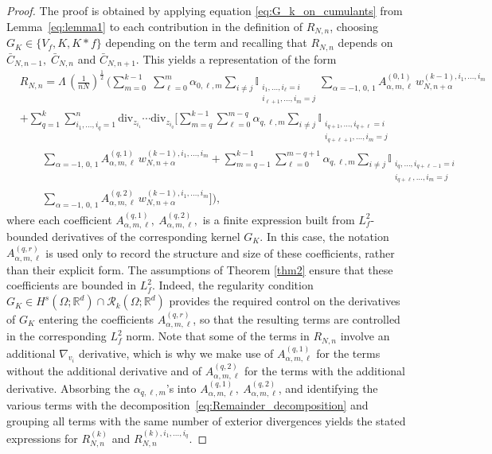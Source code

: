 \documentclass[pdflatex,sn-mathphys-num]{sn-jnl}
\theoremstyle{thmstyleone}%
\theoremstyle{thmstyletwo}%
\theoremstyle{thmstylethree}%
\begin{document}
\begin{proof}
The proof is obtained by applying equation \eqref{eq:G_k_on_cumulants} from Lemma~\ref{eq:lemma1} to each contribution in the
definition of \(R_{N,n}\), choosing \(G_K\in\{V_f,K,K\ast f\}\) depending on the term and recalling that $R_{N,n}$ depends on $\bar C_{N,n-1},\;\bar C_{N,n}$ and $\bar C_{N,n+1}$. This yields a representation of the form
\[
\begin{aligned}
&R_{N,n}
= \Lambda\,\left(\tfrac{1}{nN}\right)^{\frac12}\,\Bigg(
\sum_{m=0}^{k-1} \;\sum_{\ell=0}^{m} \alpha_{0,\ell,m}
\sum_{i\neq j}
\mathbb{I}_{\substack{i_{1},\ldots, i_{\ell}=i \\ i_{\ell+1},\ldots,i_m=j}}
\sum_{\alpha=-1,\,0,\,1}
A_{\alpha,m,\ell}^{(0,1)}\,
w_{N,n+\alpha}^{(k-1),i_1,\dots,i_{m}}
\\
& 
+\sum_{q=1}^k\sum_{i_1,\dots,i_q=1}^n
\mathrm{div}_{z_{i_1}}\cdots \mathrm{div}_{z_{i_q}}
\Bigg[
\sum_{m=q}^{k-1} \sum_{\ell=0}^{m-q}\alpha_{q,\ell,m}
\sum_{i\neq j}
\mathbb{I}_{\substack{i_{q+1},\ldots, i_{q+\ell}=i \\ i_{q+\ell+1},\ldots,i_m=j}}
\\
&\qquad
\sum_{\alpha=-1,\,0,\,1} 
A_{\alpha,m,\ell}^{(q,1)}\,
w_{N,n+\alpha}^{(k-1),i_1,\dots,i_{m}} +\sum_{m=q-1}^{k-1} \sum_{\ell=0}^{m-q+1}\alpha_{q,\ell,m}
\sum_{i\neq j}
\mathbb{I}_{\substack{
i_{q},\ldots, i_{q+\ell-1}=i \\
i_{q+\ell},\ldots,i_m=j
}}
\\
&\qquad
\sum_{\alpha=-1,\,0,\,1}
A_{\alpha,m,\ell}^{(q,2)}\,
w_{N,n+\alpha}^{(k-1),i_1,\dots,i_m}
\Bigg]
\Bigg),
\end{aligned}
\]
where each coefficient \(A_{\alpha,m,\ell}^{(q,1)},\
A_{\alpha,m,\ell}^{(q,2)},\) is a finite expression built from \(L_f^2\)-bounded derivatives
of the corresponding kernel \(G_K\). In this case, the notation \(A_{\alpha,m,\ell}^{(q,r)}\) is used only to
record the structure and size of these coefficients, rather than their explicit
form. The assumptions of Theorem \ref{thm2} ensure that these coefficients are bounded in \(L^2_f\). Indeed, the regularity condition \(G_K \in H^s(\Omega;\mathbb{R}^d)\cap \mathscr{R}_k(\Omega;\mathbb{R}^d)\) provides the required control on the derivatives of \(G_K\) entering the coefficients \(A_{\alpha,m,\ell}^{(q,r)}\), so that the resulting terms are controlled in the corresponding \(L_f^2\) norm. Note that some of the terms in $R_{N,n}$ involve an additional $\nabla_{v_i}$ derivative, which is why we make use of $A^{(q,1)}_{\alpha,m,\ell}$ for the terms without the additional derivative and of $A^{(q,2)}_{\alpha,m,\ell}$ for the terms with the additional derivative. Absorbing the $\alpha_{q,\ell,m}$'s into \(A_{\alpha,m,\ell}^{(q,1)},\
A_{\alpha,m,\ell}^{(q,2)}\), and identifying the various terms with the decomposition~\eqref{eq:Remainder_decomposition} and grouping all terms
with the same number of exterior divergences yields the stated expressions for
\(R_{N,n}^{(k)}\) and \(R_{N,n}^{(k),i_1,\dots,i_q}\).
\end{proof}
\end{document}
